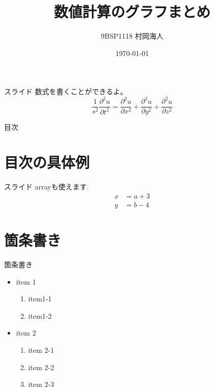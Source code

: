 \documentclass[platex,dvipdfmx]{beamer}			%
\title{数値計算のグラフまとめ}
\author{9BSP1118 村岡海人}
\date{\today}
\begin{document}
\frame{\maketitle}

\begin{frame}{スライド}
数式を書くことができるよ。
\begin{equation}
    \frac{1}{s^{2}}\frac{\partial^{2} u}{\partial t^{2}} = \frac{\partial^{2} u}{\partial x^{2}} + \frac{\partial^{2} u}{\partial y^{2}} + \frac{\partial^{2} u}{\partial z^{2}}
\end{equation}
\end{frame}

\begin{frame}{目次}
    \tableofcontents
\end{frame}

\section{目次の具体例}
\begin{frame}{スライド}
arrayも使えます.
\begin{align}
    x &= a + 3 \\
    y &= b -4
\end{align}
\end{frame}

\section{箇条書き}
\begin{frame}{箇条書き}
    \begin{itemize}
        \item item 1
        \begin{enumerate}
            \item item1-1
            \item item1-2
        \end{enumerate}
        \item item 2
        \begin{enumerate}[I]
            \item item 2-1
            \item item 2-2
            \item item 2-3
        \end{enumerate}
    \end{itemize}
\end{frame}
\end{document}
